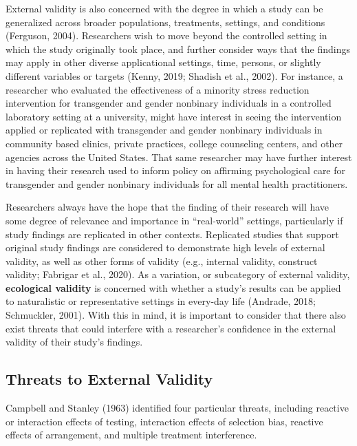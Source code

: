 \documentclass[
  11pt,
]{book}
\begin{document}
External validity is also concerned with the degree in which a study can be generalized across broader populations, treatments, settings, and conditions (Ferguson, 2004). Researchers wish to move beyond the controlled setting in which the study originally took place, and further consider ways that the findings may apply in other diverse applicational settings, time, persons, or slightly different variables or targets (Kenny, 2019; Shadish et al., 2002). For instance, a researcher who evaluated the effectiveness of a minority stress reduction intervention for transgender and gender nonbinary individuals in a controlled laboratory setting at a university, might have interest in seeing the intervention applied or replicated with transgender and gender nonbinary individuals in community based clinics, private practices, college counseling centers, and other agencies across the United States. That same researcher may have further interest in having their research used to inform policy on affirming psychological care for transgender and gender nonbinary individuals for all mental health practitioners.

Researchers always have the hope that the finding of their research will have some degree of relevance and importance in ``real-world'' settings, particularly if study findings are replicated in other contexts. Replicated studies that support original study findings are considered to demonstrate high levels of external validity, as well as other forms of validity (e.g., internal validity, construct validity; Fabrigar et al., 2020). As a variation, or subcategory of external validity, \textbf{ecological validity} is concerned with whether a study's results can be applied to naturalistic or representative settings in every-day life (Andrade, 2018; Schmuckler, 2001). With this in mind, it is important to consider that there also exist threats that could interfere with a researcher's confidence in the external validity of their study's findings.

\hypertarget{threats-to-external-validity}{%
\subsection{Threats to External Validity}\label{threats-to-external-validity}}

Campbell and Stanley (1963) identified four particular threats, including reactive or interaction effects of testing, interaction effects of selection bias, reactive effects of arrangement, and multiple treatment interference.
\end{document}
